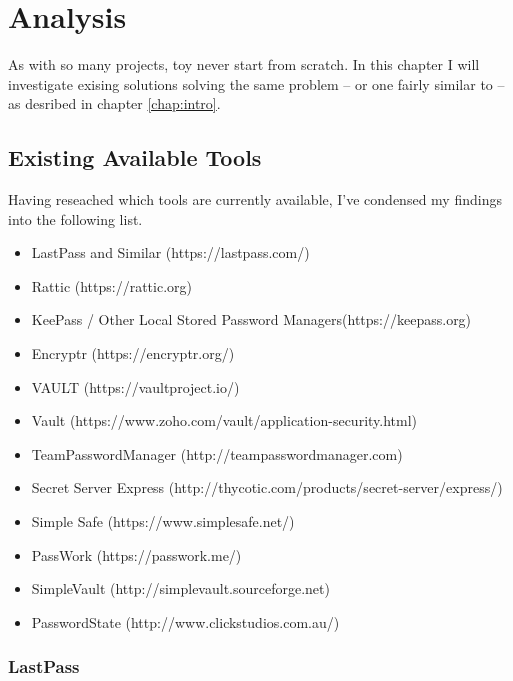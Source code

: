 \chapter{Analysis}
\label{chap:analysis}
	As with so many projects, toy never start from scratch. In this chapter I will investigate exising solutions solving the same problem -- or one fairly similar to -- as desribed in chapter \ref{chap:intro}.

	\section{Existing Available Tools}
		Having reseached which tools are currently available, I've condensed my findings into the following list. 

		\begin{itemize}
			\item LastPass and Similar (https://lastpass.com/)
			\item Rattic (https://rattic.org)
			\item KeePass / Other Local Stored Password Managers(https://keepass.org)
			\item Encryptr (https://encryptr.org/)
			\item VAULT (https://vaultproject.io/)
			\item Vault (https://www.zoho.com/vault/application-security.html)
			\item TeamPasswordManager (http://teampasswordmanager.com)
			\item Secret Server Express (http://thycotic.com/products/secret-server/express/)
			\item Simple Safe (https://www.simplesafe.net/)
			\item PassWork (https://passwork.me/)
			\item SimpleVault (http://simplevault.sourceforge.net)
			\item PasswordState (http://www.clickstudios.com.au/)
		\end{itemize}

		\subsection{LastPass}















